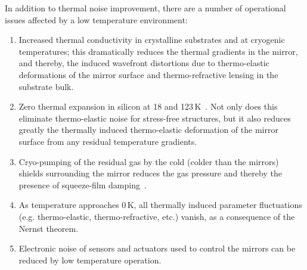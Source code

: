In addition to thermal noise improvement, there are a number of operational issues affected by a low temperature environment:
\begin{enumerate}
\item Increased thermal conductivity in crystalline substrates and at cryogenic temperatures; this dramatically reduces the thermal gradients in the mirror, and thereby, the induced wavefront distortions due to thermo-elastic deformations of the mirror surface and thermo-refractive lensing in the substrate bulk.
\item Zero thermal expansion in silicon at 18 and 123\,K~\cite{Touloukian_Brett6,Wiens:14}. Not only does this eliminate thermo-elastic noise for stress-free structures, but it also reduces greatly the thermally induced thermo-elastic deformation of the mirror surface from any residual temperature gradients.
\item Cryo-pumping of the residual gas by the cold (colder than the mirrors) shields surrounding the mirror reduces the gas pressure and thereby the presence of squeeze-film damping~\cite{Cavalleri:09,Bao:07}.
\item As temperature approaches 0\,K, all thermally induced parameter fluctuations (e.g. thermo-elastic, thermo-refractive, etc.) vanish, as a consequence of the Nernst theorem.
\item Electronic noise of sensors and actuators used to control the mirrors can be reduced by low temperature operation.
\end{enumerate}
 


